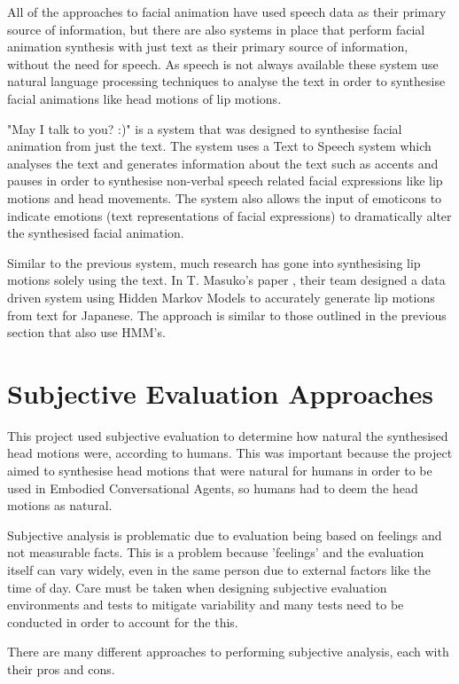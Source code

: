 \documentclass[bsc,frontabs,twoside,singlespacing,parskip]{infthesis}
\begin{document}
All of the approaches to facial animation have used speech data as their primary source of information, but there are also systems in place that perform facial animation synthesis with just text as their primary source of information, without the need for speech. As speech is not always available these system use natural language processing techniques to analyse the text in order to synthesise facial animations like head motions of lip motions.

"May I talk to you? :)"  \cite{may_i_talk_to_you} is a system that was designed to synthesise facial animation from just the text. The system uses a Text to Speech system which analyses the text and generates information about the text such as accents and pauses in order to synthesise non-verbal speech related facial expressions like lip motions and head movements. The system also allows the input of emoticons to indicate emotions (text representations of facial expressions) to dramatically alter the synthesised facial animation. 

Similar to the previous system, much research has gone into synthesising lip motions solely using the text. In T. Masuko's paper  \cite{lip_motion}, their team designed a data driven system using Hidden Markov Models to accurately generate lip motions from text for Japanese. The approach is similar to those outlined in the previous section that also use HMM's.

\section{Subjective Evaluation Approaches}

This project used subjective evaluation to determine how natural the synthesised head motions were, according to humans. This was important because the project aimed to synthesise head motions that were natural for humans in order to be used in Embodied Conversational Agents, so humans had to deem the head motions as natural.

Subjective analysis is problematic due to evaluation being based on feelings and not measurable facts. This is a problem because 'feelings' and the evaluation itself can vary widely, even in the same person due to external factors like the time of day. Care must be taken when designing subjective evaluation environments and tests to mitigate variability and many tests need to be conducted in order to account for the this. 

There are many different approaches to performing subjective analysis, each with their pros and cons. 
\end{document}
